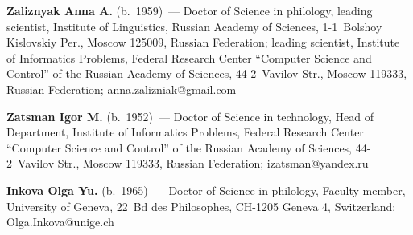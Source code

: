 \Contr


\noindent
\textbf{Zaliznyak Anna A.} (b.\ 1959)~--- Doctor of Science in philology, leading 
scientist, Institute of Linguistics, Russian Academy of Sciences, 1-1~Bolshoy Kislovskiy 
Per., Moscow 125009, Russian Federation; leading scientist, Institute of Informatics 
Problems, Federal Research Center ``Computer Science and Control'' of the Russian 
Academy of Sciences, 44-2~Vavilov Str., Moscow 119333, Russian Federation; 
\mbox{anna.zalizniak@gmail.com}

\vspace*{3pt}

\noindent
\textbf{Zatsman Igor M.} (b.\ 1952)~--- Doctor of Science in technology, Head of 
Department, Institute of Informatics Problems, Federal Research Center ``Computer 
Science and Control'' of the Russian Academy of Sciences, 44-2~Vavilov Str., Moscow 
119333, Russian Federation; \mbox{izatsman@yandex.ru}

\vspace*{3pt}

\noindent
\textbf{Inkova Olga Yu.} (b.\ 1965)~--- Doctor of Science in philology, Faculty member, University 
of Geneva, 22~Bd des Philosophes, CH-1205 Geneva 4, Switzerland; 
\mbox{Olga.Inkova@unige.ch}
   
\label{end\stat}


\renewcommand{\bibname}{\protect\rm Литература} 
    
    